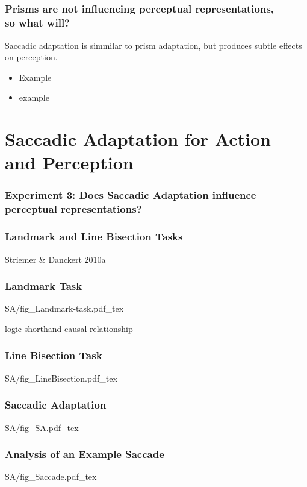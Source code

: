 \documentclass{beamer}
\begin{document}
\subsection*{}
\begin{frame}
	\frametitle{Prisms are not influencing perceptual representations, \\ so what will?}
	Saccadic adaptation is simmilar to prism adaptation, but produces subtle effects on perception.
	\begin{itemize}
		\item Example
		\item example
	\end{itemize}
\end{frame}


\section[Saccadic Adaptation]{Saccadic Adaptation for Action and Perception}

\begin{frame}
	\frametitle{Experiment 3: Does Saccadic Adaptation influence perceptual representations?}
		\tableofcontents[currentsection]
\end{frame}

\begin{frame}
	\frametitle{Landmark and Line Bisection Tasks}
	Striemer \& Danckert 2010a
\end{frame}

\begin{frame}
	\frametitle{Landmark Task}
	\def\svgwidth{0.8\textwidth}
	{SA/fig_Landmark-task.pdf_tex}
\end{frame}


\begin{frame}logic shorthand causal relationship
	\frametitle{Line Bisection Task}
	\def\svgwidth{0.9\textwidth}
	{SA/fig_LineBisection.pdf_tex}
\end{frame}

\begin{frame}
	\frametitle{Saccadic Adaptation}
	\centering
	\def\svgwidth{0.7\textwidth}
	\tiny
	{SA/fig_SA.pdf_tex}
\end{frame}


\begin{frame}
	\frametitle{Analysis of an Example Saccade}
	\centering
	\def\svgwidth{\textwidth}
	\tiny
	{SA/fig_Saccade.pdf_tex}
\end{frame}
\end{document}
